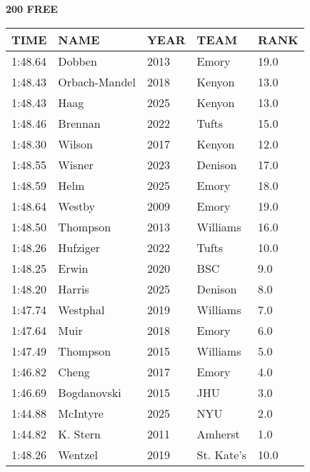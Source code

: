 \begin{minipage}[t]{0.48\textwidth}
\centering
\textbf{200 FREE}\\[0.05cm]
\begin{tabular}{@{}p{1.8cm}p{2.8cm}p{1.2cm}p{1.4cm}p{0.8cm}@{}}
\hline
\textbf{TIME} & \textbf{NAME} & \textbf{YEAR} & \textbf{TEAM} & \textbf{RANK} \\
\hline
1:48.64 & Dobben & 2013 & Emory & 19.0 \\
1:48.43 & Orbach-Mandel & 2018 & Kenyon & 13.0 \\
1:48.43 & Haag & 2025 & Kenyon & 13.0 \\
1:48.46 & Brennan & 2022 & Tufts & 15.0 \\
1:48.30 & Wilson & 2017 & Kenyon & 12.0 \\
1:48.55 & Wisner & 2023 & Denison & 17.0 \\
1:48.59 & Helm & 2025 & Emory & 18.0 \\
1:48.64 & Westby & 2009 & Emory & 19.0 \\
1:48.50 & Thompson & 2013 & Williams & 16.0 \\
1:48.26 & Hufziger & 2022 & Tufts & 10.0 \\
1:48.25 & Erwin & 2020 & BSC & 9.0 \\
1:48.20 & Harris & 2025 & Denison & 8.0 \\
1:47.74 & Westphal & 2019 & Williams & 7.0 \\
1:47.64 & Muir & 2018 & Emory & 6.0 \\
1:47.49 & Thompson & 2015 & Williams & 5.0 \\
1:46.82 & Cheng & 2017 & Emory & 4.0 \\
1:46.69 & Bogdanovski & 2015 & JHU & 3.0 \\
1:44.88 & McIntyre & 2025 & NYU & 2.0 \\
1:44.82 & K. Stern & 2011 & Amherst & 1.0 \\
1:48.26 & Wentzel & 2019 & St. Kate's & 10.0 \\
\hline
\end{tabular}
\end{minipage}\hfill
